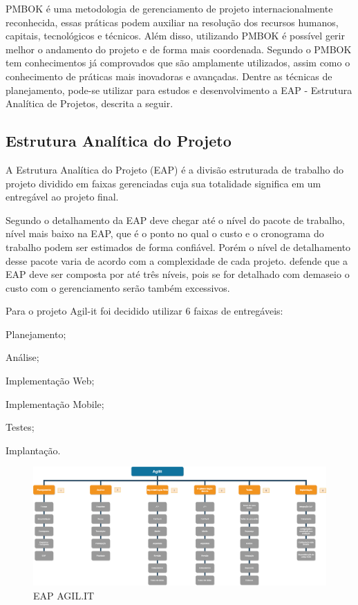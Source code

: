 PMBOK é uma metodologia de gerenciamento de projeto internacionalmente reconhecida, essas práticas podem auxiliar na resolução dos recursos humanos, capitais, tecnológicos e técnicos. Além disso, utilizando PMBOK é possível gerir melhor o andamento do projeto e de forma mais coordenada. Segundo \cite{PMG2018} o PMBOK tem conhecimentos já comprovados que são amplamente utilizados, assim como o conhecimento de práticas mais inovadoras e avançadas. Dentre as técnicas de planejamento, pode-se utilizar para estudos e desenvolvimento a EAP -  Estrutura Analítica de Projetos, descrita a seguir.

\subsection{Estrutura Analítica do Projeto}

A Estrutura Analítica do Projeto (EAP) é a divisão estruturada de trabalho do projeto dividido em faixas gerenciadas cuja sua totalidade significa em um entregável ao projeto final.
	
Segundo \cite{PMI2018} o detalhamento da EAP deve chegar até o nível do pacote de trabalho, nível mais baixo na EAP, que é o ponto no qual o custo e o cronograma do trabalho podem ser estimados de forma confiável. Porém o nível de detalhamento desse pacote varia de acordo com a complexidade de cada projeto. \cite{kerzner2017} defende que a EAP deve ser composta por até três níveis, pois se for detalhado com demaseio o custo com o gerenciamento serão também excessivos.

Para o projeto Agil-it foi decidido utilizar 6 faixas de entregáveis:

\begin{subalineas}
	\item {Planejamento};
	\item {Análise};
	\item {Implementação Web};
	\item {Implementação Mobile};
	\item {Testes};
	\item {Implantação}.
\end{subalineas}


\begin{landscape}
	\begin{figure}[htb]
		\caption{\label{EAP}EAP AGIL.IT}
		\begin{center}
			\includegraphics[scale=0.38]{./Figuras/EAP.png}
		\end{center}
	\end{figure}
\end{landscape}

